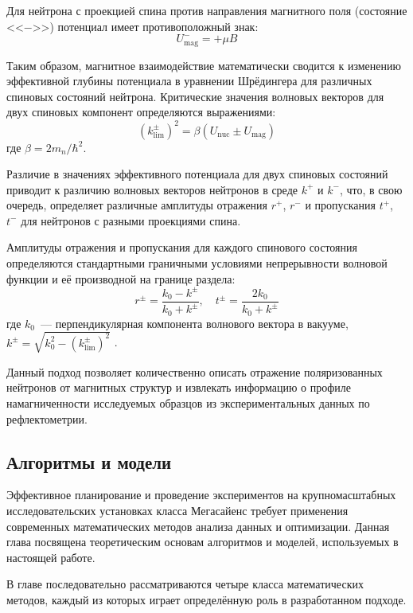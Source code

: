 \documentclass[a4paper]{article}
\begin{document}
Для нейтрона с проекцией спина против направления магнитного поля (состояние <<$-$>>) потенциал имеет противоположный знак:
\begin{equation}
U^-_{\text{mag}} = +\mu B
\end{equation}

Таким образом, магнитное взаимодействие математически сводится к изменению эффективной глубины потенциала в уравнении Шрёдингера для различных спиновых состояний нейтрона. Критические значения волновых векторов для двух спиновых компонент определяются выражениями:
\begin{equation}
(k^{\pm}_{\text{lim}})^2 = \beta(U_{\text{nuc}} \pm U_{\text{mag}})
\end{equation}
где $\beta = 2m_n/\hbar^2$.

Различие в значениях эффективного потенциала для двух спиновых состояний приводит к различию волновых векторов нейтронов в среде $k^+$ и $k^-$, что, в свою очередь, определяет различные амплитуды отражения $r^+$, $r^-$ и пропускания $t^+$, $t^-$ для нейтронов с разными проекциями спина.

Амплитуды отражения и пропускания для каждого спинового состояния определяются стандартными граничными условиями непрерывности волновой функции и её производной на границе раздела:
\begin{equation}
r^{\pm} = \frac{k_0 - k^{\pm}}{k_0 + k^{\pm}}, \quad t^{\pm} = \frac{2k_0}{k_0 + k^{\pm}}
\end{equation}
где $k_0$~--- перпендикулярная компонента волнового вектора в вакууме, $k^{\pm} = \sqrt{k_0^2 - (k^{\pm}_{\text{lim}})^2}$ \cite{34}.

Данный подход позволяет количественно описать отражение поляризованных нейтронов от магнитных структур и извлекать информацию о профиле намагниченности исследуемых образцов из экспериментальных данных по рефлектометрии.

\subsection{Алгоритмы и модели}
Эффективное планирование и проведение экспериментов на крупномасштабных исследовательских установках класса Мегасайенс требует применения современных математических методов анализа данных и оптимизации. Данная глава посвящена теоретическим основам алгоритмов и моделей, используемых в настоящей работе.

В главе последовательно рассматриваются четыре класса математических методов, каждый из которых играет определённую роль в разработанном подходе.
\end{document}
